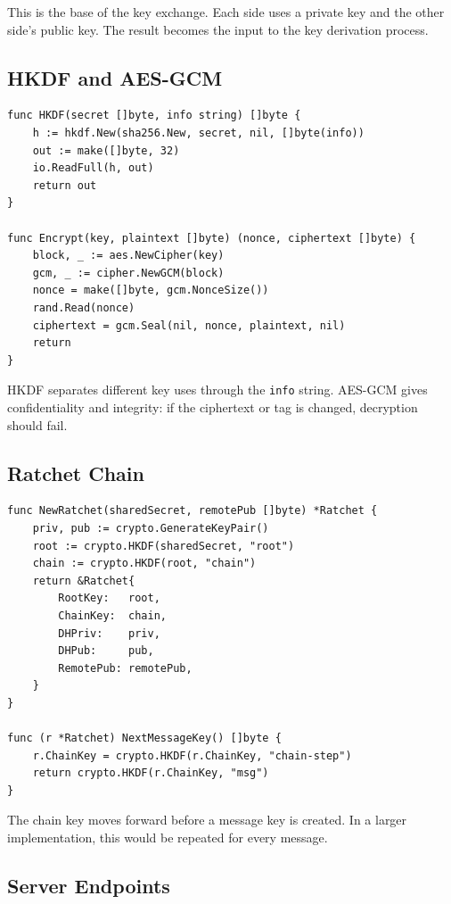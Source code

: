 \documentclass[12pt,a4paper]{article}
\begin{document}
This is the base of the key exchange. Each side uses a private key and the other side's public key. The result becomes the input to the key derivation process.

\subsection{HKDF and AES-GCM}

\begin{lstlisting}[style=code, caption={HKDF and AES-GCM helpers in internal/crypto/crypto.go}]
func HKDF(secret []byte, info string) []byte {
    h := hkdf.New(sha256.New, secret, nil, []byte(info))
    out := make([]byte, 32)
    io.ReadFull(h, out)
    return out
}

func Encrypt(key, plaintext []byte) (nonce, ciphertext []byte) {
    block, _ := aes.NewCipher(key)
    gcm, _ := cipher.NewGCM(block)
    nonce = make([]byte, gcm.NonceSize())
    rand.Read(nonce)
    ciphertext = gcm.Seal(nil, nonce, plaintext, nil)
    return
}
\end{lstlisting}

HKDF separates different key uses through the \texttt{info} string. AES-GCM gives confidentiality and integrity: if the ciphertext or tag is changed, decryption should fail.

\subsection{Ratchet Chain}

\begin{lstlisting}[style=code, caption={Message key derivation in internal/ratchet/ratchet.go}]
func NewRatchet(sharedSecret, remotePub []byte) *Ratchet {
    priv, pub := crypto.GenerateKeyPair()
    root := crypto.HKDF(sharedSecret, "root")
    chain := crypto.HKDF(root, "chain")
    return &Ratchet{
        RootKey:   root,
        ChainKey:  chain,
        DHPriv:    priv,
        DHPub:     pub,
        RemotePub: remotePub,
    }
}

func (r *Ratchet) NextMessageKey() []byte {
    r.ChainKey = crypto.HKDF(r.ChainKey, "chain-step")
    return crypto.HKDF(r.ChainKey, "msg")
}
\end{lstlisting}

The chain key moves forward before a message key is created. In a larger implementation, this would be repeated for every message.

\subsection{Server Endpoints}
\end{document}
